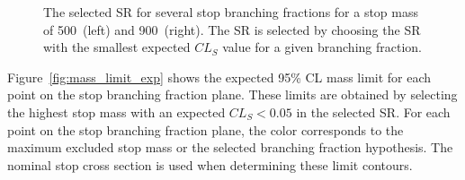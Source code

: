 \begin{figure}[ht]
  \centering
  \caption{
    The selected SR for several stop branching fractions for a stop mass of
    500~\GeV (left) and 900~\GeV (right).
    The SR is selected by choosing the SR with the smallest expected $CL_S$
    value for a given branching fraction.
  }
  \label{fig:sr_selection}
\end{figure}

Figure~\ref{fig:mass_limit_exp} shows the expected 95\% CL mass limit for each
point on the stop branching fraction plane.
These limits are obtained by selecting the highest stop mass with an expected
$CL_S < 0.05$ in the selected SR.
For each point on the stop branching fraction plane, the color corresponds to the
maximum excluded stop mass or the selected branching fraction hypothesis.
The nominal stop cross section is used when determining these limit contours.

